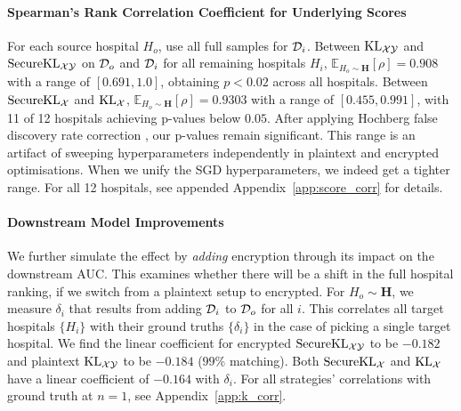 \paragraph{Spearman's Rank Correlation Coefficient for Underlying Scores}
For each source hospital $H_o$, use all full samples for $\mathcal{D}_i$. Between $\mathrm{KL}_{\mathcal{X}\mathcal{Y}}$ and $\mathrm{Secure}\mathrm{KL}_{\mathcal{X}\mathcal{Y}}$ on $\mathcal{D}_o$ and $\mathcal{D}_i$ for all remaining hospitals $H_i$, $\mathbb{E}_{H_o\sim \mathbf{H}}[\rho] = 0.908$ with a range of $[0.691,1.0]$, obtaining $p < 0.02$ across all hospitals.
Between $\mathrm{Secure}\mathrm{KL}_\mathcal{X}$ and $\mathrm{KL}_\mathcal{X}$, $\mathbb{E}_{H_o\sim \mathbf{H}}[\rho]=0.9303$ with a range of $[0.455,0.991]$, with 11 of 12 hospitals achieving p-values below $0.05$. After applying Hochberg false discovery rate correction \cite{Benjamini1995ControllingTF}, our p-values remain significant. This range is an artifact of sweeping hyperparameters independently in plaintext and encrypted optimisations. When we unify the SGD hyperparameters, we indeed get a tighter range. For all 12 hospitals, see appended Appendix~\ref{app:score_corr} for details.

\paragraph{Downstream Model Improvements}
We further simulate the effect by \emph{adding} encryption through its impact on the downstream AUC. This examines whether there will be a shift in the full hospital ranking, if we switch from a plaintext setup to encrypted. For $H_o\sim\mathbf{H}$, we measure $\delta_i$ that results from adding $\mathcal{D}_i$ to $\mathcal{D}_o$ for all $i$. This correlates all target hospitals $\{H_i\}$ with their ground truths $\{\delta_i\}$ in the case of picking a single target hospital. 
We find the linear coefficient for encrypted $\mathrm{Secure}\mathrm{KL}_{\mathcal{X}\mathcal{Y}}$ to be $-0.182$ and plaintext $\mathrm{KL}_{\mathcal{X}\mathcal{Y}}$ to be $-0.184$ ($99\%$ matching). Both $\mathrm{Secure}\mathrm{KL}_\mathcal{X}$ and $\mathrm{KL}_\mathcal{X}$ have a linear coefficient of $-0.164$ with $\delta_i$.
For all strategies' correlations with ground truth at $n=1$, see Appendix~\ref{app:k_corr}. %

